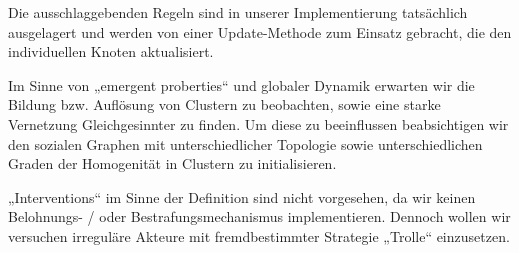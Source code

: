 \documentclass[11pt, a4paper]{scrartcl}
\begin{document}
Die ausschlaggebenden Regeln sind in unserer Implementierung tatsächlich ausgelagert und werden von einer Update-Methode zum Einsatz gebracht, die den individuellen Knoten aktualisiert.

Im Sinne von „emergent proberties“ und globaler Dynamik erwarten wir die Bildung bzw. Auflösung von Clustern zu beobachten, sowie eine starke Vernetzung Gleichgesinnter zu finden.
Um diese zu beeinflussen beabsichtigen wir den sozialen Graphen mit unterschiedlicher Topologie sowie unterschiedlichen Graden der Homogenität in Clustern zu initialisieren.

„Interventions“ im Sinne der Definition sind nicht vorgesehen, da wir keinen Belohnungs- / oder Bestrafungsmechanismus implementieren. Dennoch wollen wir versuchen irreguläre Akteure mit fremdbestimmter Strategie „Trolle“ einzusetzen.
\end{document}
